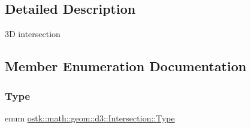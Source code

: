 \subsection{Detailed Description}
3D intersection 

\subsection{Member Enumeration Documentation}
\mbox{\label{classostk_1_1math_1_1geom_1_1d3_1_1_intersection_a21196aae3f56795cb11d07afaaaf41c1}} 
\subsubsection{\texorpdfstring{Type}{Type}}
{\footnotesize\ttfamily enum \hyperlink{classostk_1_1math_1_1geom_1_1d3_1_1_intersection_a21196aae3f56795cb11d07afaaaf41c1}{ostk\+::math\+::geom\+::d3\+::\+Intersection\+::\+Type}\hspace{0.3cm}{\ttfamily [strong]}}

